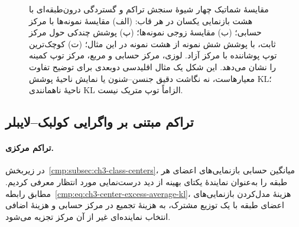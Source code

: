 \begin{figure}[!htbp]
\begin{LTR}
{%
}
\end{LTR}
\caption{مقایسهٔ شماتیک چهار شیوهٔ سنجش تراکم و گستردگی درون‌طبقه‌ای
با هشت بازنمایی یکسان در هر قاب: (الف) مقایسهٔ نمونه‌ها با مرکز
حسابی؛ (ب) مقایسهٔ زوجی نمونه‌ها؛ (پ) پوشش چندکی حول مرکز
ثابت، با پوشش شش نمونه از هشت نمونه در این مثال؛ (ت) کوچک‌ترین
توپ پوشاننده با مرکز آزاد. لوزی، مرکز حسابی و مربع، مرکز توپ
کمینه را نشان می‌دهد. این شکل یک مثال اقلیدسی دوبعدی برای
توضیح تفاوت معیارهاست، نه نگاشت دقیق جنسن--شنون یا نمایش
ناحیهٔ پوشش KL؛ ناحیهٔ ناهمانندی KL الزاماً توپ متریک نیست.}
\label{cmp:fig:ch3-compactness-four-views}
\end{figure}

\subsection{تراکم مبتنی بر واگرایی کولبک--لایبلر}
\label{cmp:subsec:ch3-compactness-KL}

\paragraph{تراکم مرکزی.}
در زیربخش~\ref{cmp:subsec:ch3-class-centers}، میانگین
حسابی بازنمایی‌های اعضای هر طبقه را به‌عنوان نمایندهٔ
یکتای بهینه از دید درست‌نمایی مورد انتظار معرفی کردیم.
مطابق رابطه~\eqref{cmp:eq:ch3-center-excess-average-kl}،
هزینهٔ مدل‌کردن بازنمایی‌های اعضای طبقه با یک توزیع
مشترک، به هزینهٔ تجمیع در مرکز حسابی و هزینهٔ اضافی
انتخاب نماینده‌ای غیر از آن مرکز تجزیه می‌شود.

